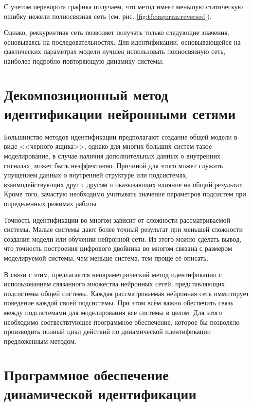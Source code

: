 С учетом переворота графика получаем, что метод имеет меньшую статическую ошибку
нежели полносвязная сеть (см. рис. \ref{fig:tf:cmp:rnn:reversed}).

Однако, реккурентная сеть позволяет получать только следующие значения,
основываясь на последовательностях. Для идентификации, основывающейся на
фактических параметрах модели лучшен использовать полносвязную сеть, наиболее
подробно повторяющую динамику системы. 

\section{Декомпозиционный метод идентификации нейронными сетями}
Большинство методов идентификации предполагают создание общей модели в виде
<<черного ящика>>, однако для многих больших систем такое моделирование, в
случае наличия дополнительных данных о внутренних сигналах, может быть
неэффективно. Причиной для этого может служить упущением данных о внутренней
структуре или подсистемах, взаимодействующих друг с другом и оказывающих влияние
на общий результат. Кроме того, зачастую необходимо учитывать значение
параметров подсистем при определенных режимах работы.

Точность идентификации во многом зависит от сложности рассматриваемой системы.
Малые системы дают более точный результат при меньшей сложности создания модели
или обучении нейронной сети. Из этого можно сделать вывод, что точность
построения цифрового двойника во многом связана с размером моделируемой системы,
чем меньше система, тем проще её описать. 

В связи с этим, предлагается непараметрический метод идентификации с
использованием связанного множества нейронных сетей, представляющих подсистемы
общей системы. Каждая рассматриваемая нейронная сеть иммитирует поведение каждой
своей подсистемы. При этом всём важно обеспечить связь между подсистемами для
моделирования все системы в целом. Для этого необходимо соотвествтующее
программное обеспечение, которое бы позволяло производить полный цикл действий
по динамической идентификации предложенным методом. 

\section{Программное обеспечение динамической идентификации}

